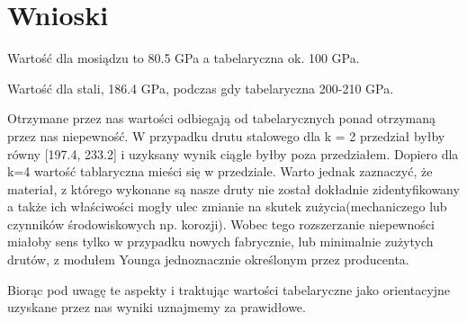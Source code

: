\documentclass{article}
\begin{document}
\section{Wnioski}
Wartość dla mosiądzu to 80.5 GPa a tabelaryczna ok. 100 GPa.

Wartość dla stali, 186.4 GPa, podczas gdy tabelaryczna 200-210 GPa.

Otrzymane przez nas wartości odbiegają od tabelarycznych ponad otrzymaną przez nas niepewność. W przypadku drutu stalowego dla k = 2 przedział byłby równy [197.4, 233.2] i uzyksany wynik ciągle byłby poza przedziałem. Dopiero dla k=4 wartość tablaryczna mieści się w przedziale. 
Warto jednak zaznaczyć, że materiał, z którego wykonane są nasze druty nie został dokładnie zidentyfikowany a także ich właściwości mogły ulec zmianie na skutek zużycia(mechaniczego lub czynników środowiskowych np. korozji). Wobec tego rozszerzanie niepewności miałoby sens tylko w przypadku nowych fabrycznie, lub minimalnie zużytych drutów, z modułem Younga jednoznacznie określonym przez producenta.

Biorąc pod uwagę te aspekty i traktując wartości tabelaryczne jako orientacyjne uzyskane przez nas wyniki uznajmemy za prawidłowe.





\end{document}
